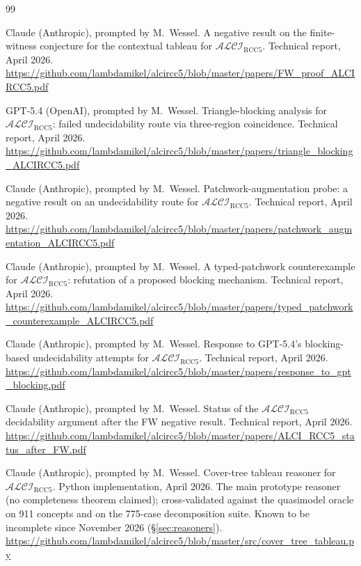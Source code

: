\documentclass[11pt]{article}
\newcommand{\ALCIRCC}[1]{\mathcal{ALCI}_{\mathrm{RCC#1}}}
\theoremstyle{plain}
\theoremstyle{definition}
\begin{document}
\begin{thebibliography}{99}

Claude (Anthropic), prompted by M.\ Wessel.
\newblock A negative result on the finite-witness conjecture for
  the contextual tableau for $\ALCIRCC{5}$.
\newblock Technical report, April 2026.
\newblock \url{https://github.com/lambdamikel/alcircc5/blob/master/papers/FW_proof_ALCIRCC5.pdf}

GPT-5.4 (OpenAI), prompted by M.\ Wessel.
\newblock Triangle-blocking analysis for $\ALCIRCC{5}$: failed
  undecidability route via three-region coincidence.
\newblock Technical report, April 2026.
\newblock \url{https://github.com/lambdamikel/alcircc5/blob/master/papers/triangle_blocking_ALCIRCC5.pdf}

Claude (Anthropic), prompted by M.\ Wessel.
\newblock Patchwork-augmentation probe: a negative result on an
  undecidability route for $\ALCIRCC{5}$.
\newblock Technical report, April 2026.
\newblock \url{https://github.com/lambdamikel/alcircc5/blob/master/papers/patchwork_augmentation_ALCIRCC5.pdf}

Claude (Anthropic), prompted by M.\ Wessel.
\newblock A typed-patchwork counterexample for $\ALCIRCC{5}$:
  refutation of a proposed blocking mechanism.
\newblock Technical report, April 2026.
\newblock \url{https://github.com/lambdamikel/alcircc5/blob/master/papers/typed_patchwork_counterexample_ALCIRCC5.pdf}

Claude (Anthropic), prompted by M.\ Wessel.
\newblock Response to GPT-5.4's blocking-based undecidability
  attempts for $\ALCIRCC{5}$.
\newblock Technical report, April 2026.
\newblock \url{https://github.com/lambdamikel/alcircc5/blob/master/papers/response_to_gpt_blocking.pdf}

Claude (Anthropic), prompted by M.\ Wessel.
\newblock Status of the $\ALCIRCC{5}$ decidability argument after
  the FW negative result.
\newblock Technical report, April 2026.
\newblock \url{https://github.com/lambdamikel/alcircc5/blob/master/papers/ALCI_RCC5_status_after_FW.pdf}


Claude (Anthropic), prompted by M.\ Wessel.
\newblock Cover-tree tableau reasoner for $\ALCIRCC{5}$.
\newblock Python implementation, April 2026.
\newblock The main prototype reasoner (no completeness theorem claimed);
  cross-validated against the quasimodel oracle on 911 concepts and on the
  775-case decomposition suite. Known to be incomplete since November 2026
  (\S\ref{sec:reasoners}).
\newblock \url{https://github.com/lambdamikel/alcircc5/blob/master/src/cover_tree_tableau.py}


\end{thebibliography}
\end{document}
